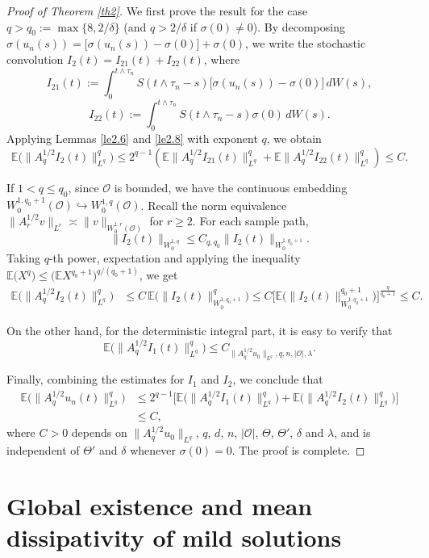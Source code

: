 \documentclass[10pt]{article}
\numberwithin{figure}{section}
\numberwithin{equation}{section}
\newcommand{\0}{{\theta}}
\def\de{\delta}
\def\({\left(}\def\){\right)}
\begin{document}
\begin{proof}[Proof of Theorem \ref{th2}]
We first prove the result for the case $q>q_0:=\max\{8,2/\delta\}$ (and $q>2/\delta$ if $\sigma(0)\neq0$).
By decomposing $\sigma(u_n(s))=\big[\sigma(u_n(s))-\sigma(0)\big]+\sigma(0)$,
we write the stochastic convolution $I_2(t)=I_{21}(t)+I_{22}(t)$, where
$$
I_{21}(t):=\int_0^{t\wedge\tau_n}S(t\wedge\tau_n-s)\big[\sigma(u_n(s))-\sigma(0)\big]\,dW(s),
$$
$$
I_{22}(t):=\int_0^{t\wedge\tau_n}S(t\wedge\tau_n-s)\sigma(0)\,dW(s).
$$
Applying Lemmas \ref{le2.6} and \ref{le2.8} with exponent $q$, we obtain
$$
\mathbb{E}\big(\|A_{q}^{1/2}I_2(t)\|_{L^{q}}^{q}\big)\le2^{q-1}\(\mathbb{E}\|A_{q}^{1/2}I_{21}(t)\|_{L^{q}}^{q}+
\mathbb{E}\|A_{q}^{1/2}I_{22}(t)\|_{L^{q}}^{q}\)\le C.
$$

If $1<q\le q_0$, since $\mathcal O$ is bounded, we have the continuous embedding
$W_0^{1,q_0+1}(\mathcal O)\hookrightarrow W_0^{1,q}(\mathcal O)$.
Recall the norm equivalence
$\|A_r^{1/2}v\|_{L^r}\asymp \|v\|_{W_0^{1,r}(\mathcal O)}$ for $r\ge2$.
For each sample path,
$$
\|I_2(t)\|_{W_0^{1,q}} \le C_{q,q_0}\|I_2(t)\|_{W_0^{1,q_0+1}}.
$$
Taking $q$-th power, expectation and applying the inequality
$\mathbb{E} \big(X^q\big) \le \bigl(\mathbb{E} X^{q_0+1} \bigr)^{q/(q_0+1)}$, we get
$$
\begin{aligned}
\mathbb{E}\big(\|A_q^{1/2}I_2(t)\|_{L^q}^q\big)
&\le C\,\mathbb{E}\big(\|I_2(t)\|_{W_0^{1,q_0+1}}^q\big) \le C \Big[\mathbb{E}\Big(\|I_2(t)\|_{W_0^{1,q_0+1}}^{q_0+1}\Big)\Big]^{\frac{q}{q_0+1}}
\le C.
\end{aligned}
$$

On the other hand, for the deterministic integral part, it is easy to verify that
$$
\mathbb{E}\big(\|A_q^{1/2}I_1(t)\|_{L^q}^q\big)
\le C_{\|A_q^{1/2}u_0\|_{L^q},q,n,|\mathcal O|,\lambda}.
$$

Finally, combining the estimates for $I_1$ and $I_2$, we conclude that
\begin{align*}
\mathbb{E}\big(\|A_q^{1/2}u_n(t)\|_{L^q}^q\big)
&\le 2^{q-1}\Big[\mathbb{E}\big(\|A_q^{1/2}I_1(t)\|_{L^q}^q\big)
+\mathbb{E}\big(\|A_q^{1/2}I_2(t)\|_{L^q}^q\big)\Big] \\
&\le C,
\end{align*}
where $C>0$ depends on $\|A_q^{1/2}u_0\|_{L^q}$, $q$, $d$, $n$, $|\mathcal O|$, $\Theta$, $\Theta'$, $\delta$ and $\lambda$, and is independent of $\Theta'$ and $\de$ whenever $\sigma(0)=0$.
The proof is complete.
\end{proof}\section{Global existence and mean dissipativity of mild solutions}\label{se4}
\end{document}
